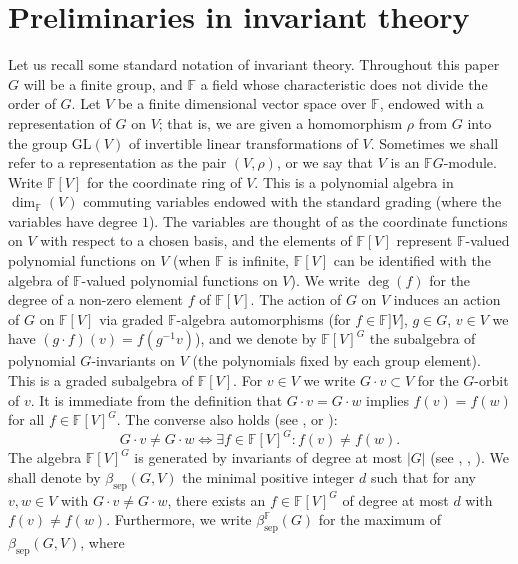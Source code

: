 \documentclass[12pt, oneside]{amsart}
\def\FF{\mathbb{F}}
\def\sepbeta{\beta_{\mathrm{sep}}}
\begin{document}
\section{Preliminaries in invariant theory} \label{sec:prel} 

Let us recall some standard notation of invariant theory. 
Throughout this paper $G$ will be a finite group, and $\FF$ a field whose characteristic does not divide the order of $G$. 
Let $V$ be a finite dimensional vector space over $\FF$, endowed with a representation of $G$ on $V$; that is, we are given a 
homomorphism $\rho$ from $G$ into the group $\mathrm{GL}(V)$ of invertible linear transformations of $V$. 
Sometimes we shall refer to a representation as the pair $(V,\rho)$, or we say that $V$ is an $\FF G$-module. 
Write $\FF[V]$ for the coordinate ring of $V$. This is a polynomial algebra in $\dim_\FF(V)$ commuting variables 
endowed with the 
standard grading (where the variables have degree $1$). 
 The variables are thought of as the coordinate functions on $V$ with respect to a chosen basis, 
and the elements of $\FF[V]$ represent $\FF$-valued polynomial functions on $V$ (when $\FF$ is infinite, 
$\FF[V]$ can be identified with the 
algebra of $\FF$-valued  polynomial functions on $V$). 
We write $\deg(f)$ for the degree 
of a non-zero element $f$ of $\FF[V]$. 
The action of $G$ on $V$ induces an action of $G$ on $\FF[V]$ 
via graded $\FF$-algebra automorphisms 
(for $f\in \FF]V]$, $g\in G$, $v\in V$ we have $(g\cdot f)(v)=f(g^{-1}v)$),  
and we denote by $\FF[V]^G$ the subalgebra of polynomial 
$G$-invariants on $V$ (the polynomials fixed by each group element). 
This is a graded subalgebra of $\FF[V]$.  
For $v\in V$ we write $G\cdot v\subset V$ for the $G$-orbit of $v$. 
It is immediate from the definition that $G\cdot v=G\cdot w$ implies $f(v)=f(w)$ for all 
$f\in \FF[V]^G$. The converse also holds (see \cite[Theorem 3.12.1]{derksen-kemper}, 
\cite[Theorem 16]{kemper} or \cite[Lemma 3.1]{draisma-kemper-wehlau}): 
\begin{equation}\label{eq:separability by invariants} 
G\cdot v\neq G\cdot w\iff \exists f\in\FF[V]^G\colon f(v)\neq f(w).
\end{equation} 
The algebra $\FF[V]^G$ is generated by invariants of degree at most $|G|$ 
(see \cite{noether}, \cite{fleischmann}, \cite{fogarty}). 
We shall denote by $\sepbeta(G,V)$ the minimal positive integer $d$ such that 
for any $v,w\in V$ with $G\cdot v\neq G\cdot w$, there exists an $f\in\FF[V]^G$ of degree 
at most $d$ with $f(v)\neq f(w)$. 
Furthermore, we write $\sepbeta^\FF(G)$ for the maximum of $\sepbeta(G,V)$, where 
\end{document}
